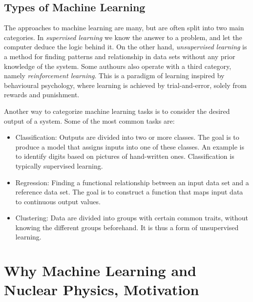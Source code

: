 \documentclass[%
oneside,                 %
final,                   %
10pt]{article}
\begin{document}
\subsection{Types of Machine Learning}



The approaches to machine learning are many, but are often split into two main categories. 
In \emph{supervised learning} we know the answer to a problem,
and let the computer deduce the logic behind it. On the other hand, \emph{unsupervised learning}
is a method for finding patterns and relationship in data sets without any prior knowledge of the system.
Some authours also operate with a third category, namely \emph{reinforcement learning}. This is a paradigm 
of learning inspired by behavioural psychology, where learning is achieved by trial-and-error, 
solely from rewards and punishment.

Another way to categorize machine learning tasks is to consider the desired output of a system.
Some of the most common tasks are:

\begin{itemize}
  \item Classification: Outputs are divided into two or more classes. The goal is to   produce a model that assigns inputs into one of these classes. An example is to identify  digits based on pictures of hand-written ones. Classification is typically supervised learning.

  \item Regression: Finding a functional relationship between an input data set and a reference data set.   The goal is to construct a function that maps input data to continuous output values.

  \item Clustering: Data are divided into groups with certain common traits, without knowing the different groups beforehand.  It is thus a form of unsupervised learning.
\end{itemize}


 




\section{Why Machine Learning and Nuclear Physics, Motivation}
\end{document}
